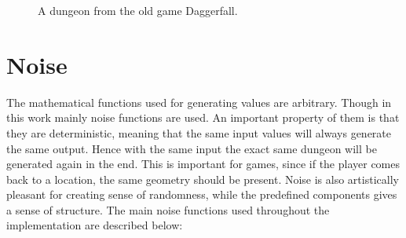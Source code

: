 \documentclass[a4paper]{article}
\begin{document}
\begin{figure}
\noindent{}\label{daggerfall}

\caption{A dungeon from the old game Daggerfall.}
\end{figure}


\section{Noise%
  \label{noise}%
}

The mathematical functions used for generating values are arbitrary. Though in this work mainly noise functions are used. An important property of them is that they are deterministic, meaning that the same input values will always generate the same output. Hence with the same input the exact same dungeon will be generated again in the end. This is important for games, since if the player comes back to a location, the same geometry should be present. Noise is also artistically pleasant for creating sense of randomness, while the predefined components gives a sense of structure. The main noise functions used throughout the implementation are described below:
\end{document}
